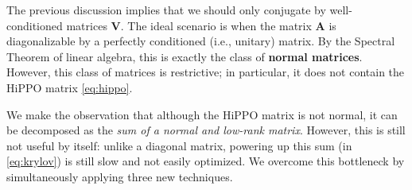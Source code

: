 The previous discussion implies that we should only conjugate by well-conditioned matrices \( \bm{V} \).
The ideal scenario is when the matrix \( \bm{A} \) is diagonalizable by a perfectly conditioned (i.e., unitary) matrix. By the Spectral Theorem of linear algebra, this is exactly the class of \textbf{normal matrices}. However, this class of matrices is restrictive; in particular, it does not contain the HiPPO matrix \eqref{eq:hippo}.

\begin{algorithm}[t]
  \caption{\textsc{S4 Convolution Kernel (Sketch)}}
  \label{alg:s4-convolution}
\end{algorithm}

We make the observation that although the HiPPO matrix is not normal, it can be decomposed as the \emph{sum of a normal and low-rank matrix}. However, this is still not useful by itself: unlike a diagonal matrix, powering up this sum (in \eqref{eq:krylov}) is still slow and not easily optimized. We overcome this bottleneck by simultaneously applying three new techniques.

